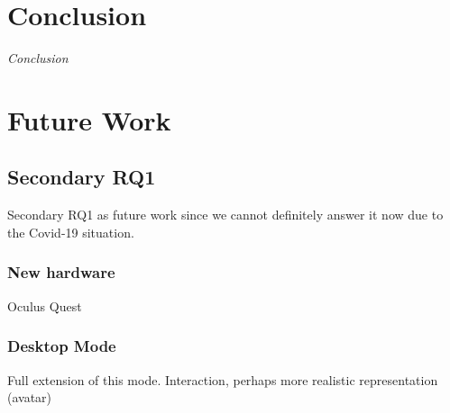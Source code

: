 \section{Conclusion}
\textit{Conclusion}

\section{Future Work}
\label{section:futureWork}

\subsection{Secondary RQ1}
Secondary RQ1 as future work since we cannot definitely answer it now due to the Covid-19 situation.


\subsubsection{New hardware}
Oculus Quest 

\subsubsection{Desktop Mode}
Full extension of this mode. Interaction, perhaps more realistic representation (avatar)

\cleardoublepage